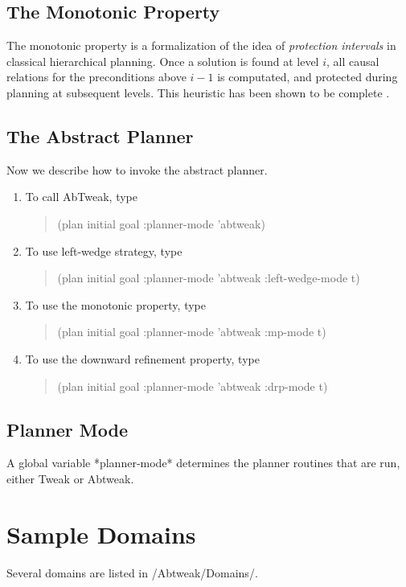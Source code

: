 \subsection{The Monotonic Property}
The monotonic property is a formalization of the idea of {\em
protection intervals} in classical hierarchical planning.  Once a
solution is found at level $i$, all causal relations for the
preconditions above $i-1$ is computated, and protected during planning
at subsequent levels.  This heuristic has been shown to be complete \cite{abtweak}.

\subsection{The Abstract Planner}
Now we describe how to invoke the abstract planner.

\begin{enumerate}
\item To call AbTweak, type 
\begin{quote}
(plan initial goal :planner-mode 'abtweak)
\end{quote}
\item To use left-wedge strategy, type
\begin{quote}
(plan initial goal :planner-mode 'abtweak :left-wedge-mode t)
\end{quote}
\item To use the monotonic property, type
\begin{quote}
(plan initial goal :planner-mode 'abtweak :mp-mode t)
\end{quote}
\item To use the downward refinement property, type
\begin{quote}
(plan initial goal :planner-mode 'abtweak :drp-mode t)
\end{quote}
\end{enumerate}

\subsection{Planner Mode}
A global variable *planner-mode* determines the planner routines that
are run, either Tweak or Abtweak.

\section{Sample Domains}
Several domains are listed in /Abtweak/Domains/.

